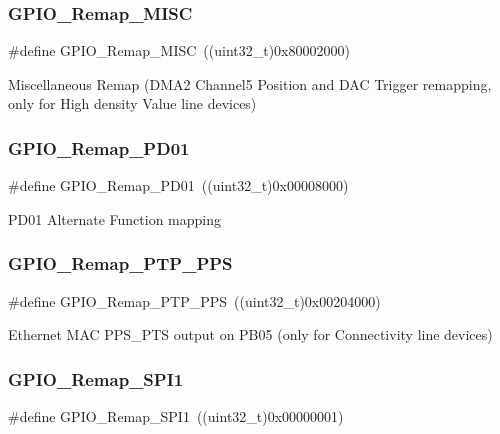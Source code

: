 \subsubsection{\texorpdfstring{GPIO\_Remap\_MISC}{GPIO\_Remap\_MISC}}
{\footnotesize\ttfamily \#define G\+P\+I\+O\+\_\+\+Remap\+\_\+\+M\+I\+SC~((uint32\+\_\+t)0x80002000)}

Miscellaneous Remap (D\+M\+A2 Channel5 Position and D\+AC Trigger remapping, only for High density Value line devices) \mbox{\label{group___g_p_i_o___remap__define_gaeac44191de99d55a5fa03e29b74d5e59}} 
\subsubsection{\texorpdfstring{GPIO\_Remap\_PD01}{GPIO\_Remap\_PD01}}
{\footnotesize\ttfamily \#define G\+P\+I\+O\+\_\+\+Remap\+\_\+\+P\+D01~((uint32\+\_\+t)0x00008000)}

P\+D01 Alternate Function mapping \mbox{\label{group___g_p_i_o___remap__define_ga3e9d7808d1e50393afde08e4a45d18aa}} 
\subsubsection{\texorpdfstring{GPIO\_Remap\_PTP\_PPS}{GPIO\_Remap\_PTP\_PPS}}
{\footnotesize\ttfamily \#define G\+P\+I\+O\+\_\+\+Remap\+\_\+\+P\+T\+P\+\_\+\+P\+PS~((uint32\+\_\+t)0x00204000)}

Ethernet M\+AC P\+P\+S\+\_\+\+P\+TS output on P\+B05 (only for Connectivity line devices) \mbox{\label{group___g_p_i_o___remap__define_ga58b02a04a6041954c6e99e681716ab4c}} 
\subsubsection{\texorpdfstring{GPIO\_Remap\_SPI1}{GPIO\_Remap\_SPI1}}
{\footnotesize\ttfamily \#define G\+P\+I\+O\+\_\+\+Remap\+\_\+\+S\+P\+I1~((uint32\+\_\+t)0x00000001)}

